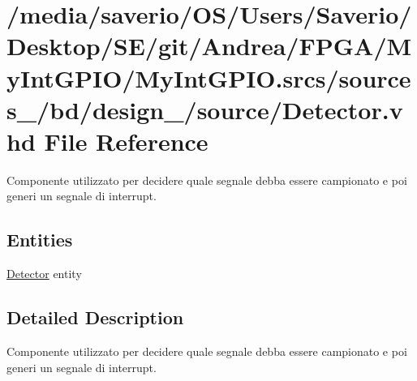 \hypertarget{Detector_8vhd}{}\section{/media/saverio/\+O\+S/\+Users/\+Saverio/\+Desktop/\+S\+E/git/\+Andrea/\+F\+P\+G\+A/\+My\+Int\+G\+P\+I\+O/\+My\+Int\+G\+P\+IO.srcs/sources\+\_/bd/design\+\_/source/\+Detector.vhd File Reference}
\label{Detector_8vhd}


Componente utilizzato per decidere quale segnale debba essere campionato e poi generi un segnale di interrupt.  


\subsection*{Entities}
\begin{DoxyCompactItemize}
\item 
\hyperlink{classDetector}{Detector} entity
\end{DoxyCompactItemize}


\subsection{Detailed Description}
Componente utilizzato per decidere quale segnale debba essere campionato e poi generi un segnale di interrupt. 

